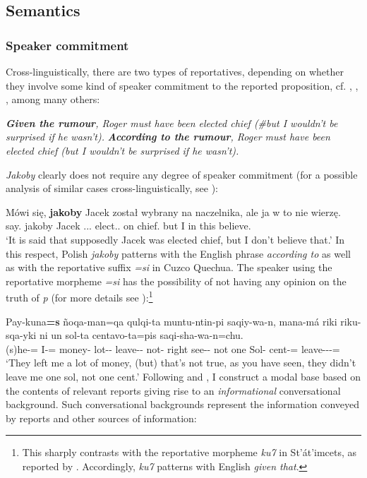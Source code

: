 \documentclass[output=paper]{langsci/langscibook}
\begin{document}
\subsection{Semantics}

\subsubsection{Speaker commitment}
Cross-linguistically, there are two types of reportatives, depending on whether they involve some kind of speaker commitment to the reported proposition, cf. \textcite{Faller2011}, \textcite{Kratzer2012}, \textcite{Murray2017}, among many others:

\ea	\ea	\textit{\textbf{Given the rumour}, Roger must have been elected chief (\#but I wouldn't be surprised if he wasn't).}
	\ex	\textit{\textbf{According to the rumour}, Roger must have been elected chief (but I wouldn't be surprised if he wasn't).} 
\z\z

\noindent \emph{Jakoby} clearly does not require any degree of speaker commitment (for a possible analysis of similar cases cross-linguistically, see \citealt{AnderBois2014}):

\ea \gll Mówi się, \textbf{jakoby} Jacek został wybrany na naczelnika, ale ja w to nie wierzę. \\
		say.{\thirdperson}{\sg} {} jakoby Jacek  {\passaux}.{\lptcp}.{\sg}.{\masc} elect.{\ptcp}.{\masc} on chief.{\acc} but I in this {\negation} believe.{\firstperson}{\sg} \\
\glt	`It is said that supposedly Jacek was elected chief, but I don't believe that.' 
\z
In this respect, Polish \emph{jakoby} patterns with the English phrase \emph{according to} as well as with the reportative suffix \emph{=si} in Cuzco Quechua. The speaker using the reportative morpheme \emph{=si} has the possibility of not having any opinion on the truth of \emph{p} (for more details see \citealt{Faller2011}):\footnote{
This sharply contrasts with the reportative morpheme \emph{ku7} in St'át'imcets, as reported by \textcite{Lisa-Matthewson-Davis2017}. Accordingly, \emph{ku7} patterns with English \emph{given that}.
}

\ea \gll Pay-kuna\textbf{=s} ñoqa-man=qa qulqi-ta muntu-ntin-pi saqiy-wa-n, mana-má riki riku-sqa-yki ni un sol-ta centavo-ta=pis saqi-sha-wa-n=chu. \\
		(s)he-{\pl}={\rep} I-{\illa}={\topi} money-{\acc} lot-{\incl}-{\LOC} leave-{\firstperson}{\object}-{\thirdperson} not-{\impr} right see-{\ptcp}-{\secondperson} not one Sol-{\acc} cent-{\acc}={\add} leave-{\prog}-{\firstperson}{\object}-{\thirdperson}={\negation} \\
\glt	 `They left me a lot of money, (but) that's not true, as you have seen, they didn't leave me one sol, not one cent.'
\z
Following \textcite{Kratzer2012} and \textcite{Faller2011}, I construct a modal base based on the contents of relevant reports giving rise to an \emph{informational} conversational background. Such conversational backgrounds represent the information conveyed by reports and other sources of information:
\end{document}
